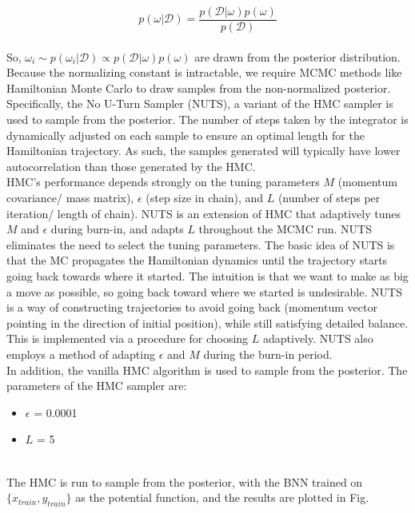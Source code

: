 \documentclass[11pt,a4paper]{article}
\begin{document}
\begin{equation}
    p(\omega|\mathcal{D}) = \frac{p(\mathcal{D}|\omega) p(\omega)}{p(\mathcal{D})}
\end{equation} \\
So, $\omega_i \sim p(\omega_i| \mathcal{D}) \propto p(\mathcal{D}|\omega) p(\omega) $ are drawn from the posterior distribution. Because the normalizing constant is intractable, we require MCMC methods like Hamiltonian Monte Carlo to draw samples from the non-normalized posterior. Specifically, the No U-Turn Sampler (NUTS), a variant of the HMC sampler is used to sample from the posterior. The number of steps taken by the integrator is dynamically adjusted on each sample to ensure an optimal length for the Hamiltonian trajectory. As such, the samples generated will typically have lower autocorrelation than those generated by the HMC. \\
HMC’s performance depends strongly on the tuning parameters $M$ (momentum covariance/ mass matrix), $\epsilon$ (step size in chain), and $L$ (number of steps per iteration/ length of chain).
NUTS is an extension of HMC that adaptively tunes $M$ and $\epsilon$ during burn-in, and adapts $L$ throughout the MCMC run. NUTS eliminates the need to select the tuning parameters. The basic idea of NUTS is that the MC propagates the Hamiltonian dynamics until the trajectory starts going back towards where it started. The intuition is that we want to make as big a move as possible, so going back toward where we started is undesirable. NUTS is a way of constructing trajectories to avoid going back (momentum vector pointing in the direction of initial position), while still satisfying detailed balance.
This is implemented via a procedure for choosing $L$ adaptively. NUTS also employs a method of adapting $\epsilon$ and $M$ during the burn-in period. \\

In addition, the vanilla HMC algorithm is used to sample from the posterior. The parameters of the HMC sampler are:
\begin{itemize}
    \item $\epsilon$ = 0.0001
    \item $L$ = 5
\end{itemize} \\
The HMC is run to sample from the posterior, with the BNN trained on $\{x_{train}, y_{train}\}$ as the potential function, and the results are plotted in Fig.\fbox{\ref{fig:vanilla hmc}}
\end{document}
